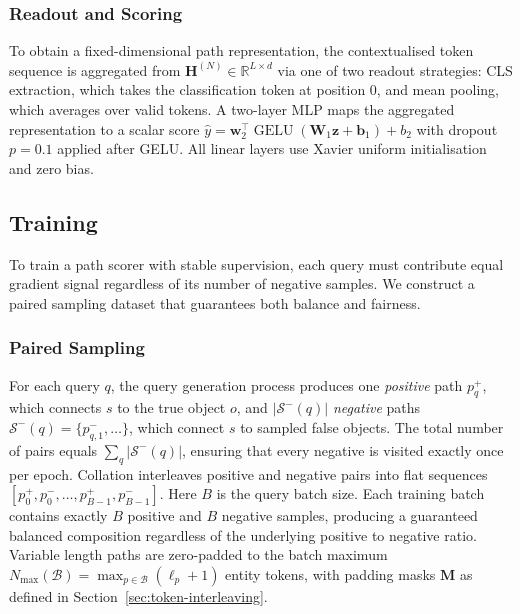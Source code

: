 \documentclass[runningheads]{llncs}
\begin{document}
\subsubsection{Readout and Scoring}

\label{sec:readout}

To obtain a fixed-dimensional path representation, the contextualised token
sequence is aggregated from
$\mathbf{H}^{(N)} \in \mathbb{R}^{L \times d}$
via one of two readout strategies: CLS extraction, which takes the
classification token at position 0, and mean pooling, which averages
over valid tokens.
A two-layer MLP maps the aggregated representation to a scalar score
$\hat{y} = \mathbf{w}_2^{\top} \operatorname{GELU}(\mathbf{W}_1 \mathbf{z} + \mathbf{b}_1) + b_2$
with dropout $p = 0.1$ applied after GELU.
All linear layers use Xavier
uniform initialisation and zero bias.

\subsection{Training}

\label{sec:training}

To train a path scorer with stable supervision, each query must contribute equal gradient
signal regardless of its number of negative samples.
We construct a paired sampling
dataset that guarantees both balance and fairness.
\subsubsection{Paired Sampling}
\label{sec:paired-sampling}

For each query $q$, the query generation process produces one
\textit{positive} path $p^+_q$, which connects $s$ to the
true object $o$, and $|\mathcal{S}^-(q)|$ \textit{negative} paths
$\mathcal{S}^-(q) = \{p^-_{q,1}, \ldots\}$, which connect
$s$ to sampled false objects. The total number of pairs equals
$\sum_q |\mathcal{S}^-(q)|$, ensuring that every negative is visited exactly
once per epoch. Collation interleaves positive and negative pairs
into flat sequences
$[p^+_0, p^-_0, \ldots, p^+_{B-1}, p^-_{B-1}]$.
Here $B$ is the query batch size. Each training batch contains
exactly $B$ positive and $B$ negative samples, producing a guaranteed
balanced composition regardless of the underlying positive to negative
ratio. Variable length paths are zero-padded to the batch maximum
$N_{\max}(\mathcal{B}) = \max_{p \in \mathcal{B}} (\ell_p + 1)$
entity tokens, with padding masks $\mathbf{M}$ as defined in
Section~\ref{sec:token-interleaving}.
\end{document}
